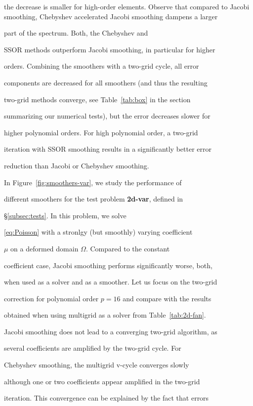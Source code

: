 \documentclass[smallcondensed,final]{svjour3}     %
\begin{document}
the decrease is smaller for high-order elements. Observe that compared to Jacobi smoothing, Chebyshev accelerated Jacobi smoothing dampens a larger

part of the spectrum.  Both, the Chebyshev and

SSOR methods outperform Jacobi smoothing, in particular for higher

orders. Combining the smoothers with a two-grid cycle, all error

components are decreased for all smoothers (and thus the resulting

two-grid methods converge, see Table~\ref{tab:box} in the section

summarizing our numerical tests), but the error decreases slower for

higher polynomial orders. For high polynomial order, a two-grid

iteration with SSOR smoothing results in a significantly better error

reduction than Jacobi or Chebyshev smoothing.



In Figure~\ref{fig:smoothers-var}, we study the performance of

different smoothers for the test problem {\bf 2d-var}, defined in

\S\ref{subsec:tests}. In this problem, we solve

\eqref{eq:Poisson} with a stronlgy (but smoothly) varying coefficient

$\mu$ on a deformed domain $\Omega$.  Compared to the constant

coefficient case, Jacobi smoothing performs significantly worse, both,

when used as a solver and as a smoother. Let us focus on the two-grid

correction for polynomial order $p=16$ and compare with the results

obtained when using multigrid as a solver from Table~\ref{tab:2d-fan}.

Jacobi smoothing does not lead to a converging two-grid algorithm, as

several coefficients are amplified by the two-grid cycle. For

Chebyshev smoothing, the multigrid v-cycle converges slowly

although one or two coefficients appear amplified in the two-grid

iteration. This convergence can be explained by the fact that errors
\end{document}
